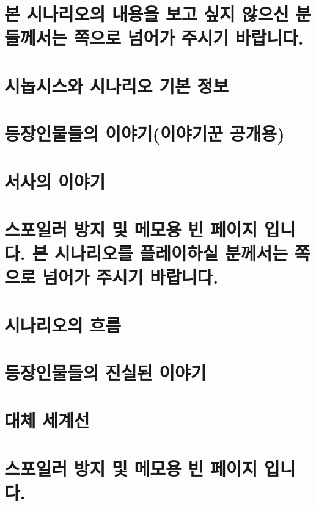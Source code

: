 \documentclass{report}
\begin{document}
	\chapter*{본 시나리오의 내용을 보고 싶지 않으신 분들께서는 \pageref{endof_Unliving}쪽으로 넘어가 주시기 바랍니다.}
	
	\chapter{시놉시스와 시나리오 기본 정보}
	
	\chapter{등장인물들의 이야기(이야기꾼 공개용)}
	
	\chapter{서사의 이야기}
	
	\chapter*{스포일러 방지 및 메모용 빈 페이지 입니다. 본 시나리오를 플레이하실 분께서는 \pageref{endof_Unliving}쪽으로 넘어가 주시기 바랍니다.}
	
	\parttoc
	
	\chapter{시나리오의 흐름}
		
	
	\chapter{등장인물들의 진실된 이야기}
	
	\chapter{대체 세계선}
		
		
	\chapter*{스포일러 방지 및 메모용 빈 페이지 입니다.}
\end{document}
